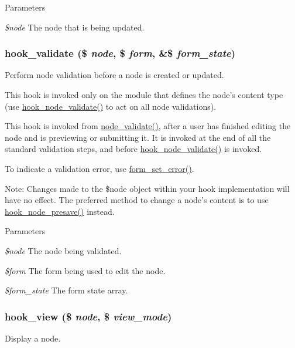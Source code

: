 \begin{DoxyParams}{Parameters}
\item[{\em \$node}]The node that is being updated. \end{DoxyParams}
\hypertarget{group__node__api__hooks_gacaf7cff104c642c28f76ce7ec5f33f40}{
\subsubsection[{hook\_\-validate}]{\setlength{\rightskip}{0pt plus 5cm}hook\_\-validate (\$ {\em node}, \/  \$ {\em form}, \/  \&\$ {\em form\_\-state})}}
\label{group__node__api__hooks_gacaf7cff104c642c28f76ce7ec5f33f40}
Perform node validation before a node is created or updated.

This hook is invoked only on the module that defines the node's content type (use \hyperlink{group__node__api__hooks_gad26227eaf0dd513134767a11be40ab1d}{hook\_\-node\_\-validate()} to act on all node validations).

This hook is invoked from \hyperlink{node_8module_a9f5f6b14ffa70a478e11e60b1fe9d254}{node\_\-validate()}, after a user has finished editing the node and is previewing or submitting it. It is invoked at the end of all the standard validation steps, and before \hyperlink{group__node__api__hooks_gad26227eaf0dd513134767a11be40ab1d}{hook\_\-node\_\-validate()} is invoked.

To indicate a validation error, use \hyperlink{group__form__api_ga6f4ecbec42e905390e521b393417f97f}{form\_\-set\_\-error()}.

Note: Changes made to the \$node object within your hook implementation will have no effect. The preferred method to change a node's content is to use \hyperlink{group__node__api__hooks_gab339b1a1ce0e235d4a9c5a05e410dcd6}{hook\_\-node\_\-presave()} instead.


\begin{DoxyParams}{Parameters}
\item[{\em \$node}]The node being validated. \item[{\em \$form}]The form being used to edit the node. \item[{\em \$form\_\-state}]The form state array. \end{DoxyParams}
\hypertarget{group__node__api__hooks_gab1f229603b5e0f2f9d9e2a3ab53dcbda}{
\subsubsection[{hook\_\-view}]{\setlength{\rightskip}{0pt plus 5cm}hook\_\-view (\$ {\em node}, \/  \$ {\em view\_\-mode})}}
\label{group__node__api__hooks_gab1f229603b5e0f2f9d9e2a3ab53dcbda}
Display a node.

